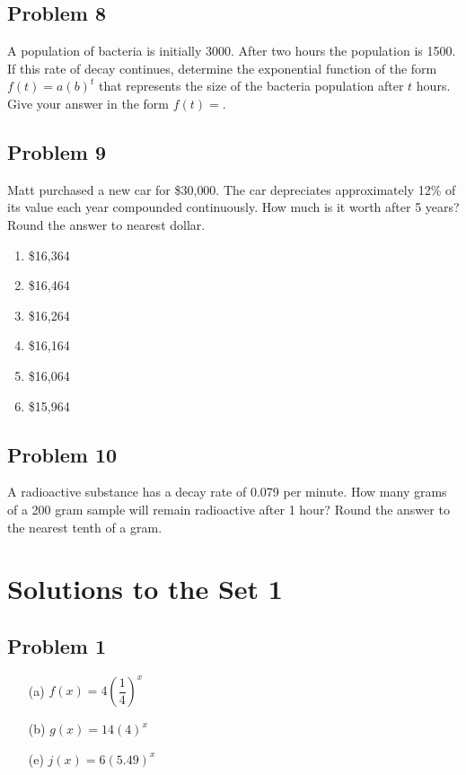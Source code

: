 \documentclass[12pt]{article}
\begin{document}
\subsection*{Problem 8}
A population of bacteria is initially 3000. After two hours the population is 1500. If this rate of decay continues, determine the exponential function of the form \( f(t) = a(b)^t \) that represents the size of the bacteria population after \( t \) hours. Give your answer in the form \(f(t)=\).


\subsection*{Problem 9}
Matt purchased a new car for \$30{,}000. The car depreciates approximately 12\% of its value each year compounded continuously. How much is it worth after 5 years? Round the answer to nearest dollar.

\begin{enumerate}[label=(\alph*)]
    \item \$16{,}364
    \item \$16{,}464
    \item \$16{,}264
    \item \$16{,}164
    \item \$16{,}064
    \item \$15{,}964
\end{enumerate}

\subsection*{Problem 10}
A radioactive substance has a decay rate of 0.079 per minute. How many grams of a 200 gram sample will remain radioactive after 1 hour? Round the answer to the nearest tenth of a gram.


\newpage
\section*{Solutions to the Set 1}

\subsection*{Problem 1}
\begin{enumerate}
    \item[(a)] \(f(x)=4(\dfrac{1}{4})^x\)
    \item[(b)] \(g(x)=14(4)^x\)
    \item[(e)] \(j(x)=6(5.49)^x\)
\end{enumerate}
\end{document}
